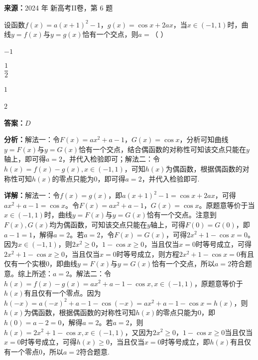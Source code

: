 \begin{question}[points=5]
\textbf{来源：}2024 年 新高考II卷，第 6 题\par
设函数$f(x)=a(x+1)^2-1$，$g(x)=\cos x+2ax$，当$x\in(-1,1)$时，曲线$y=f(x)$与$y=g(x)$恰有一个交点，则$a=$（ ）
\begin{choices}
  \item $-1$
  \item $\dfrac{1}{2}$
  \item $1$
  \item $2$
\end{choices}
\begin{solution}
\textbf{答案：}$D$

\textbf{分析：}解法一：令$F(x)=ax^2+a-1$，$G(x)=\cos x$，分析可知曲线$y=F(x)$与$y=G(x)$恰有一个交点，结合偶函数的对称性可知该交点只能在$y$轴上，即可得$a=2$，并代入检验即可；解法二：令$h(x)=f(x)-g(x),x\in(-1,1)$，可知$h(x)$为偶函数，根据偶函数的对称性可知$h(x)$的零点只能为0，即可得$a=2$，并代入检验即可.

\textbf{详解：}解法一：令$f(x)=g(x)$，即$a(x+1)^2-1=\cos x+2ax$，可得$ax^2+a-1=\cos x$。令$F(x)=ax^2+a-1$，$G(x)=\cos x$。原题意等价于当$x\in(-1,1)$时，曲线$y=F(x)$与$y=G(x)$恰有一个交点。注意到$F(x),G(x)$均为偶函数，可知该交点只能在$y$轴上，可得$F(0)=G(0)$，即$a-1=1$，解得$a=2$。若$a=2$，令$F(x)=G(x)$，可得$2x^2+1-\cos x=0$。因为$x\in(-1,1)$，则$2x^2\ge0$，$1-\cos x\ge0$，当且仅当$x=0$时等号成立，可得$2x^2+1-\cos x\ge0$，当且仅当$x=0$时等号成立，则方程$2x^2+1-\cos x=0$有且仅有一个实根0，即曲线$y=F(x)$与$y=G(x)$恰有一个交点，所以$a=2$符合题意。综上所述：$a=2$。解法二：令$h(x)=f(x)-g(x)=ax^2+a-1-\cos x,x\in(-1,1)$，原题意等价于$h(x)$有且仅有一个零点。因为$h(-x)=a(-x)^2+a-1-\cos(-x)=ax^2+a-1-\cos x=h(x)$，则$h(x)$为偶函数，根据偶函数的对称性可知$h(x)$的零点只能为0，即$h(0)=a-2=0$，解得$a=2$。若$a=2$，则$h(x)=2x^2+1-\cos x,x\in(-1,1)$，又因为$2x^2\ge0$，$1-\cos x\ge0$当且仅当$x=0$时等号成立，可得$h(x)\ge0$，当且仅当$x=0$时等号成立，即$h(x)$有且仅有一个零点0，所以$a=2$符合题意.
\end{solution}
\end{question}

